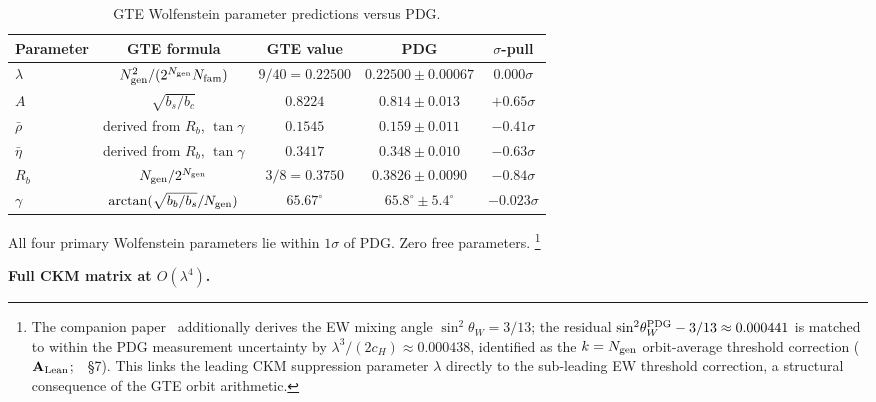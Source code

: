\documentclass[11pt]{article}
\theoremstyle{remark}
\newcommand{\Ngen}{N_{\rm gen}}
\newcommand{\Nfam}{N_{\rm fam}}
\newcommand{\cH}{c_H}
\newcommand{\lam}{\lambda}
\newcommand{\Rbar}{\bar{\rho}}
\newcommand{\Ebar}{\bar{\eta}}
\newcommand{\bc}{b_c}
\newcommand{\bs}{b_s}
\newcommand{\bb}{b_b}
\newcommand{\Rb}{R_b}
\newcommand{\sinwsq}{\sin^2\!\theta_W}
\newcommand{\CatAL}{\ensuremath{\textbf{A}_{\rm Lean}}}
\begin{document}
\begin{table}[H]
\centering
\caption{GTE Wolfenstein parameter predictions versus PDG.}
\label{tab:wolfenstein}
\small
\renewcommand{\arraystretch}{1.25}
\begin{tabular}{lcccc}
\toprule
Parameter & GTE formula & GTE value & PDG & $\sigma$-pull \\
\midrule
$\lam$ & $\Ngen^2/(2^{\Ngen}\Nfam)$ & $9/40 = 0.22500$ & $0.22500\pm 0.00067$ & $0.000\sigma$ \\
$A$    & $\sqrt{\bs/\bc}$ & $0.8224$ & $0.814\pm 0.013$ & $+0.65\sigma$ \\
$\Rbar$ & derived from $\Rb$, $\tan\gamma$ & $0.1545$ & $0.159\pm 0.011$ & $-0.41\sigma$ \\
$\Ebar$ & derived from $\Rb$, $\tan\gamma$ & $0.3417$ & $0.348\pm 0.010$ & $-0.63\sigma$ \\
$\Rb$ & $\Ngen/2^{\Ngen}$ & $3/8 = 0.3750$ & $0.3826\pm 0.0090$ & $-0.84\sigma$ \\
$\gamma$ & $\arctan(\sqrt{\bb/\bs}/\Ngen)$ & $65.67^\circ$ & $65.8^\circ\pm 5.4^\circ$ & $-0.023\sigma$ \\
\bottomrule
\end{tabular}
\end{table}

All four primary Wolfenstein parameters lie within $1\sigma$ of PDG.  Zero free parameters.%
\footnote{The companion paper~\cite{SpivackWeinberg} additionally derives the EW mixing angle
  $\sinwsq = 3/13$; the residual
  $\sinwsq^{\rm PDG} - 3/13 \approx 0.000441$ is matched to within the PDG measurement
  uncertainty by $\lam^3/(2\cH) \approx 0.000438$, identified as the $k = \Ngen$
  orbit-average threshold correction ($\CatAL$;~\cite{SpivackWeinberg}~\S7).
  This links the leading CKM suppression parameter $\lam$ directly to the sub-leading
  EW threshold correction, a structural consequence of the GTE orbit arithmetic.}

\medskip

\textbf{Full CKM matrix at $O(\lam^4)$.}
\end{document}
